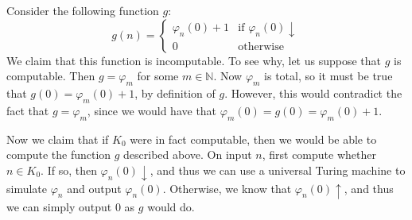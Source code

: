 \documentclass{article}
\newcommand{\nat}{\mathbb{N}}
\newcommand{\halts}{\downarrow}
\newcommand{\nhalts}{\uparrow}
\begin{document}
Consider the following function $g$:
$$g(n) = \begin{cases}
    \varphi_n(0) + 1
    & \text{if } \varphi_n(0)\downarrow\\
    0
    & \text{otherwise}
\end{cases}$$
We claim that this function is incomputable.
To see why, let us suppose that $g$ is computable.
Then $g = \varphi_m$ for some $m \in \nat$.
Now $\varphi_m$ is total, so it must be true that $g(0) = \varphi_m(0) + 1$, by definition of $g$.
However, this would contradict the fact that $g = \varphi_m$, since we would have that $\varphi_m(0) = g(0) = \varphi_{m}(0)+1$.

Now we claim that if $K_0$ were in fact computable, then we would be able to compute the function $g$ described above.
On input $n$, first compute whether $n \in K_0$.
If so, then $\varphi_n(0) \halts$, and thus we can use a universal Turing machine to simulate $\varphi_n$ and output $\varphi_n(0)$.
Otherwise, we know that $\varphi_n(0) \nhalts$, and thus we can simply output 0 as $g$ would do.
\end{document}

